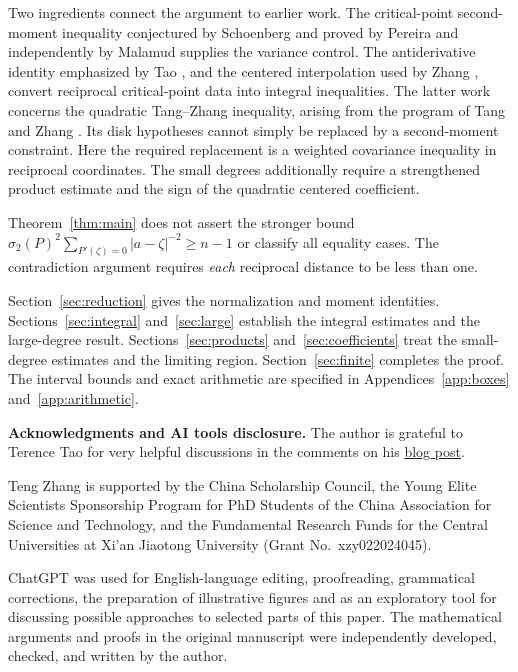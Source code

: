\documentclass[11pt,reqno]{amsart}
\theoremstyle{definition}
\theoremstyle{remark}
\numberwithin{equation}{section}
\begin{document}
Two ingredients connect the argument to earlier work. The critical-point second-moment inequality conjectured by Schoenberg \cite{Sch86} and proved by Pereira \cite[\S3, pp.~341--343]{Per03} and independently by Malamud \cite{Mal05} supplies the variance control. The antiderivative identity emphasized by Tao \cite[Lemma~6, equation~(9)]{Tao26}, and the centered interpolation used by Zhang \cite[Lemmas~3.1 and~5.1]{Zha26}, convert reciprocal critical-point data into integral inequalities. The latter work concerns the quadratic Tang--Zhang inequality, arising from the program of Tang and Zhang \cite{TZ25}. Its disk hypotheses cannot simply be replaced by a second-moment constraint. Here the required replacement is a weighted covariance inequality in reciprocal coordinates. The small degrees additionally require a strengthened product estimate and the sign of the quadratic centered coefficient.

Theorem~\ref{thm:main} does not assert the stronger bound $\sigma_2(P)^2\sum_{P'(\zeta)=0}|a-\zeta|^{-2}\ge n-1$ or classify all equality cases. The contradiction argument requires \emph{each} reciprocal distance to be less than one.

Section~\ref{sec:reduction} gives the normalization and moment identities. Sections~\ref{sec:integral} and~\ref{sec:large} establish the integral estimates and the large-degree result. Sections~\ref{sec:products} and~\ref{sec:coefficients} treat the small-degree estimates and the limiting region. Section~\ref{sec:finite} completes the proof. The interval bounds and exact arithmetic are specified in Appendices~\ref{app:boxes} and~\ref{app:arithmetic}.

\medskip
\noindent\textbf{Acknowledgments and AI tools disclosure. } The author is grateful to Terence Tao for very helpful discussions in the comments on his \href{https://terrytao.wordpress.com/2026/08/12/a-digestion-of-the-proof-of-sendovs-conjecture/}{blog post}.

Teng Zhang is supported by the China Scholarship Council, the Young Elite Scientists Sponsorship Program for PhD Students of the China Association for Science and Technology, and the Fundamental Research Funds for the Central Universities at Xi'an Jiaotong University (Grant No.~xzy022024045).

ChatGPT was used for English-language editing, proofreading, grammatical corrections, the preparation of illustrative figures and as an exploratory tool for discussing possible approaches to selected parts of this paper. The mathematical arguments and proofs in the original manuscript were independently developed, checked, and written by the author.
\end{document}
